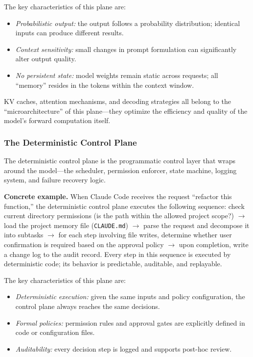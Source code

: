 \documentclass[11pt,a4paper]{article}
\begin{document}
The key characteristics of this plane are:
\begin{itemize}[nosep]
\item \textit{Probabilistic output:} the output follows a probability distribution; identical inputs can produce different results.
\item \textit{Context sensitivity:} small changes in prompt formulation can significantly alter output quality.
\item \textit{No persistent state:} model weights remain static across requests; all ``memory'' resides in the tokens within the context window.
\end{itemize}

KV caches, attention mechanisms, and decoding strategies all belong to the ``microarchitecture'' of this plane---they optimize the efficiency and quality of the model's forward computation itself.

\subsubsection{The Deterministic Control Plane}

The deterministic control plane is the programmatic control layer that wraps around the model---the scheduler, permission enforcer, state machine, logging system, and failure recovery logic.

\textbf{Concrete example.}
When Claude Code receives the request ``refactor this function,'' the deterministic control plane executes the following sequence: check current directory permissions (is the path within the allowed project scope?) $\to$ load the project memory file (\texttt{CLAUDE.md}) $\to$ parse the request and decompose it into subtasks $\to$ for each step involving file writes, determine whether user confirmation is required based on the approval policy $\to$ upon completion, write a change log to the audit record\cite{anthropic_claudecode_security_2026}.
Every step in this sequence is executed by deterministic code; its behavior is predictable, auditable, and replayable.

The key characteristics of this plane are:
\begin{itemize}[nosep]
\item \textit{Deterministic execution:} given the same inputs and policy configuration, the control plane always reaches the same decisions.
\item \textit{Formal policies:} permission rules and approval gates are explicitly defined in code or configuration files.
\item \textit{Auditability:} every decision step is logged and supports post-hoc review.
\end{itemize}
\end{document}
